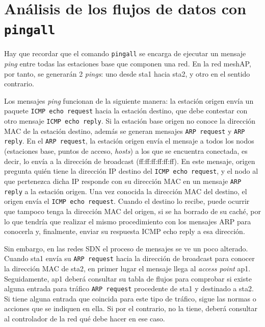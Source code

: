 \documentclass[a4paper,12pt,twoside,spanish]{book}
\begin{document}
\section{Análisis de los flujos de datos con \texttt{\textbf{pingall}}}\label{sect:tablas_flujos}


Hay que recordar que el comando \texttt{pingall} se encarga de ejecutar un mensaje \textit{ping} entre todas las estaciones base que componen una red. En la red meshAP, por tanto, se generarán 2 \textit{pings}: uno desde sta1 hacia sta2, y otro en el sentido contrario.\par

Los mensajes \textit{ping} funcionan de la siguiente manera: la estación origen envía un paquete \texttt{ICMP echo request} hacia la estación destino, que debe contestar con otro mensaje \texttt{ICMP echo reply}. Si la estación base origen no conoce la dirección MAC de la estación destino, además se generan mensajes \texttt{ARP request} y \texttt{ARP reply}. En el \texttt{ARP request}, la estación origen envía el mensaje a todos los nodos (estaciones base, puntos de acceso, \textit{hosts}) a los que se encuentra conectada, es decir, lo envía a la dirección de broadcast (ff:ff:ff:ff:ff:ff). En este mensaje, origen pregunta quién tiene la dirección IP destino del \texttt{ICMP echo request}, y el nodo al que pertenezca dicha IP responde con su dirección MAC en un mensaje \texttt{ARP reply} a la estación origen. Una vez conocida la dirección MAC del destino, el origen envía el \texttt{ICMP echo request}. Cuando el destino lo recibe, puede ocurrir que tampoco tenga la dirección MAC del origen, si se ha borrado de su caché, por lo que tendría que realizar el mismo procedimiento con los mensajes ARP para conocerla y, finalmente, enviar su respuesta ICMP echo reply a esa dirección.\par

Sin embargo, en las redes SDN el proceso de mensajes se ve un poco alterado. Cuando sta1 envía su \texttt{ARP request} hacia la dirección de broadcast para conocer la dirección MAC de sta2, en primer lugar el mensaje llega al \textit{access point} ap1. Seguidamente, ap1 deberá consultar su tabla de flujos para comprobar si existe alguna entrada para tráfico \texttt{ARP request} procedente de sta1 y destinado a sta2. Si tiene alguna entrada que coincida para este tipo de tráfico, sigue las normas o acciones que se indiquen en ella. Si por el contrario, no la tiene, deberá consultar al controlador de la red qué debe hacer en ese caso.\par 
\end{document}
